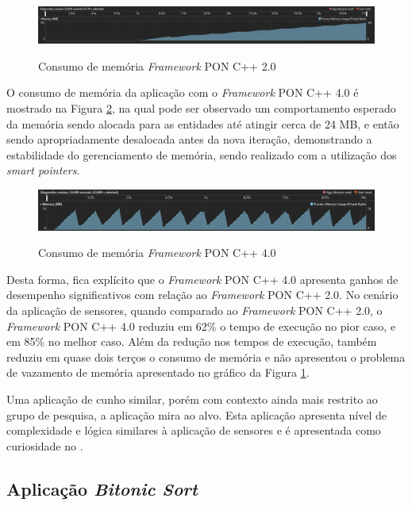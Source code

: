 \begin{figure}[!htb]
\centering
\caption{Consumo de memória \textit{Framework} PON C++ 2.0}
\includegraphics[width=\textwidth]{../figures/fw2_mem.png}
\smallskip
{}
\label{fig:fw2_mem}
\end{figure}

O consumo de memória da aplicação com o \textit{Framework} PON C++ 4.0 é
mostrado na Figura \ref{fig:fw4_mem}, na qual pode ser observado um
comportamento esperado da memória sendo alocada para as entidades até atingir
cerca de 24 MB, e então sendo apropriadamente desalocada antes da nova iteração,
demonstrando a estabilidade do gerenciamento de memória, sendo realizado com a
utilização dos \textit{smart pointers}.

\begin{figure}[!htb]
\centering
\caption{Consumo de memória \textit{Framework} PON C++ 4.0}
\includegraphics[width=\textwidth]{../figures/fw4_mem.png}
\smallskip
{}
\label{fig:fw4_mem}
\end{figure}

Desta forma, fica explícito que o \textit{Framework} PON C++ 4.0 apresenta
ganhos de desempenho significativos com relação ao \textit{Framework} PON C++
2.0. No cenário da aplicação de sensores, quando comparado ao \textit{Framework}
PON C++ 2.0, o \textit{Framework} PON C++ 4.0 reduziu em 62\% o tempo de
execução no pior caso, e em 85\% no melhor caso. Além da redução nos tempos de
execução, também reduziu em quase dois terços o consumo de memória e não
apresentou o problema de vazamento de memória apresentado no gráfico da Figura
\ref{fig:fw2_mem}.

Uma aplicação de cunho similar, porém com contexto ainda mais restrito ao grupo
de pesquisa, a aplicação mira ao alvo. Esta aplicação apresenta nível de
complexidade e lógica similares à aplicação de sensores e é apresentada como
curiosidade no .

\subsection{Aplicação \textit{Bitonic Sort}}\label{sec:bitonic_sort}

